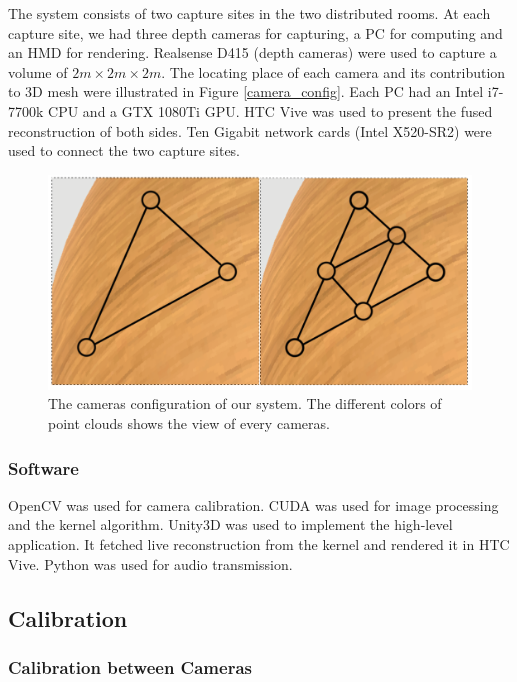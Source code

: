 The system consists of two capture sites in the two distributed rooms. At each capture site, we had three depth cameras for capturing, a PC for computing and an HMD for rendering. Realsense D415 (depth cameras) were used to capture a volume of $2m \times 2m \times 2m$. The locating place of each camera and its contribution to 3D mesh were illustrated in Figure \ref{camera_config}. Each PC had an Intel i7-7700k CPU and a GTX 1080Ti GPU. HTC Vive was used to present the fused reconstruction of both sides. Ten Gigabit network cards (Intel X520-SR2) were used to connect the two capture sites. 

\begin{figure}[!htbp]
\centering
\includegraphics[width=0.9\linewidth]{figures/figure_mc.png}
\caption{The cameras configuration of our system. The different colors of point clouds shows the view of every cameras.}
\label{fig:camera_config}
\end{figure}

\subsubsection{Software}

OpenCV was used for camera calibration. CUDA was used for image processing and the kernel algorithm. Unity3D was used to implement the high-level application. It fetched live reconstruction from the kernel and rendered it in HTC Vive. Python was used for audio transmission.

\subsection{Calibration}

\subsubsection{Calibration between Cameras}

